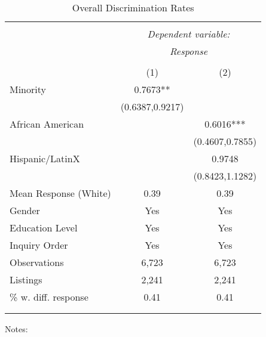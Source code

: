    \begin{table}[H] \footnotesize \centering \begin{threeparttable} \captionsetup{justification=centering}   \caption{Overall Discrimination Rates }   \label{tab:probhighexposure}  \begin{tabular}{@{\extracolsep{5pt}} lcc}  \\[-1.8ex]\hline  \hline \\[-1.8ex]  & \multicolumn{2}{c}{\it Dependent variable:} \\ & \multicolumn{2}{c}{\it  Response} \\ \cline{2-3}\\ [-1.8ex]  &(1)              & (2)                   \\        
\hline
Minority            &      0.7673** &               \\
                    &(0.6387,0.9217)   &               \\
African American    &               &      0.6016***\\
                    &               &(0.4607,0.7855)   \\
Hispanic/LatinX     &               &      0.9748   \\
                    &               &(0.8423,1.1282)   \\
\hline
 Mean Response (White)&        0.39   &        0.39   \\
\hline Gender       &         Yes   &         Yes   \\
Education Level     &         Yes   &         Yes   \\
Inquiry Order       &         Yes   &         Yes   \\
\hline Observations &       6,723   &       6,723   \\
Listings            &       2,241   &       2,241   \\
\% w. diff. response&        0.41   &        0.41   \\
   \\[-1.8ex]\hline  \hline \\[-1.8ex]  \end{tabular}   \begin{tablenotes} \scriptsize \item Notes:  \end{tablenotes} \end{threeparttable} \end{table} 
